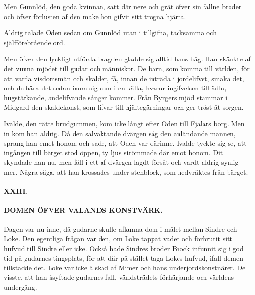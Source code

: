Men Gunnlöd, den goda kvinnan, satt där nere och grät
\protect\hypertarget{lb1625905.xhtmlux5cux23start72}{}{}\protect\hypertarget{lb1625905.xhtmlux5cux23start72-a}{}{}\protect\hypertarget{lb1625905.xhtmlux5cux23start72-b}{}{}\protect\hypertarget{lb1625905.xhtmlux5cux23start72-c}{}{}\protect\hypertarget{lb1625905.xhtmlux5cux23start72-d}{}{}
öfver sin fallne broder och öfver förlusten af den make hon gifvit sitt
trogna hjärta.

Aldrig talade Oden sedan om Gunnlöd utan i tillgifna, tacksamma och
själfförebrående ord.

Men öfver den lyckligt utförda bragden gladde sig alltid hans håg. Han
skänkte af det vunna mjödet till gudar och människor. De barn, som komma
till världen, för att varda visdomsmän och skalder, få, innan de inträda
i jordelifvet, smaka det, och de bära det sedan inom sig som i en källa,
hvarur ingifvelsen till ädla, hugstärkande, andelifvande sånger kommer.
Från Byrgers mjöd stammar i Midgard den skaldekonst, som lifvar till
hjältegärningar och ger tröst åt sorgen.

Ivalde, den rätte brudgummen, kom icke långt efter Oden till Fjalars
borg. Men in kom han aldrig. Då den salvaktande dvärgen såg den
anländande mannen, sprang han emot honom och sade, att Oden var därinne.
Ivalde tyckte sig se, att ingången till bärget stod öppen, ty ljus
strömmade där emot honom. Dit skyndade han nu, men föll i ett af dvärgen
lagdt försåt och vardt aldrig synlig mer. Några säga, att han krossades
under stenblock, som nedvräktes från bärget.

\paragraph{XXIII.}

\paragraph{DOMEN ÖFVER VALANDS KONSTVÄRK.}

Dagen var nu inne, då gudarne skulle afkunna dom i målet mellan Sindre
och Loke. Den egentliga frågan var den, om Loke tappat vadet och
förbrutit sitt hufvud till Sindre eller icke. Också hade Sindres broder
Brock infunnit sig i god tid på gudarnes tingsplats, för att där på
stället taga Lokes hufvud, ifall domen tillstadde det. Loke var icke
älskad af Mimer och hans underjordskonstnärer. De visste, att han
åsyftade gudarnes fall, världsträdets förhärjande och världens
undergång.

